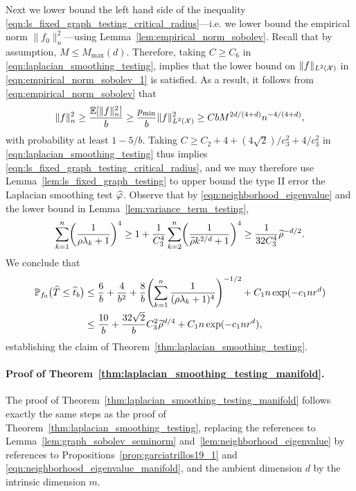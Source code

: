 Next we lower bound the left hand side of the inequality \eqref{eqn:ls_fixed_graph_testing_critical_radius}---i.e. we lower bound the empirical norm $\|f_0\|_n^2$---using Lemma~\ref{lem:empirical_norm_sobolev}. Recall that by assumption, $M \leq M_{\max}(d)$. Therefore, taking $C \geq C_6$ in \eqref{eqn:laplacian_smoothing_testing}, implies that the lower bound on $\|f\|_{L^2(\mathcal{X})}$ in \eqref{eqn:empirical_norm_sobolev_1} is satisfied. As a result, it follows from \eqref{eqn:empirical_norm_sobolev} that
\begin{equation*}
\|f\|_n^2 \geq \frac{\mathbb{E}[\|f\|_n^2]}{b} \geq \frac{p_{\min}}{b} \|f\|_{L^2(\mathcal{X})}^2 \geq CbM^{2d/(4 + d)}n^{-4/(4 + d)},
\end{equation*}
with probability at least $1 - 5/b$. Taking $C \geq C_2 + 4 + (4\sqrt{2})/c_3^{2} + 4/c_3^2$ in \eqref{eqn:laplacian_smoothing_testing} thus implies \eqref{eqn:ls_fixed_graph_testing_critical_radius}, and we may therefore use Lemma~\ref{lem:ls_fixed_graph_testing} to upper bound the type II error the Laplacian smoothing test $\widehat{\varphi}$. Observe that by \eqref{eqn:neighborhood_eigenvalue} and the lower bound in Lemma~\ref{lem:variance_term_testing}, 
\begin{equation*}
\sum_{k = 1}^{n} \biggl(\frac{1}{\rho \lambda_k + 1}\biggr)^4 \geq 1 + \frac{1}{C_3^4}\sum_{k = 2}^{n}\biggl(\frac{1}{\widetilde{\rho}k^{2/d} + 1}\biggr)^4 \geq \frac{1}{32C_3^4}\widetilde{\rho}^{-d/2}.
\end{equation*}
We conclude that
\begin{align*}
\mathbb{P}_{f_0}\bigl(\widehat{T} \leq \widehat{t}_b\bigr) & \leq \frac{6}{b} + \frac{4}{b^2} + \frac{8}{b} \Biggl(\sum_{k = 1}^{n} \frac{1}{(\rho\lambda_k + 1)^4} \Biggr)^{-1/2} + C_1n\exp(-c_1nr^d)\\
& \leq \frac{10}{b} + \frac{32\sqrt{2}}{b} C_3^{2}\widetilde{\rho}^{d/4} + C_1n\exp(-c_1nr^d),
\end{align*}
establishing the claim of Theorem~\ref{thm:laplacian_smoothing_testing}.

\paragraph{Proof of Theorem~\ref{thm:laplacian_smoothing_testing_manifold}.}
The proof of Theorem~\ref{thm:laplacian_smoothing_testing_manifold} follows exactly the same steps as the proof of Theorem~\ref{thm:laplacian_smoothing_testing}, replacing the references to Lemma~\ref{lem:graph_sobolev_seminorm} and~\ref{lem:neighborhood_eigenvalue} by references to Propositions~\ref{prop:garciatrillos19_1} and \eqref{eqn:neighborhood_eigenvalue_manifold}, and the ambient dimension $d$ by the intrinsic dimension $m$.

